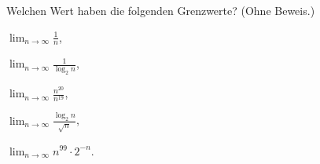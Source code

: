 \documentclass{uebung_cs}
\begin{document}
\begin{aufgabe}[Grenzwerte]
    Welchen Wert haben die folgenden Grenzwerte? (Ohne Beweis.)
    \begin{enumerate*}[(a)]
        \item $\lim_{n\to\infty} \tfrac1{n}$,\;
        \item $\lim_{n\to\infty} \tfrac1{\log_2 n}$,\;
        \item $\lim_{n\to\infty} \tfrac{n^{20}}{n^{19}}$,\;
        \item $\lim_{n\to\infty} \tfrac{\log_2 n}{\sqrt{n}}$,\;
        \item $\lim_{n\to\infty} n^{99} \cdot 2^{-n}$.
    \end{enumerate*}
\end{aufgabe}
\end{document}
